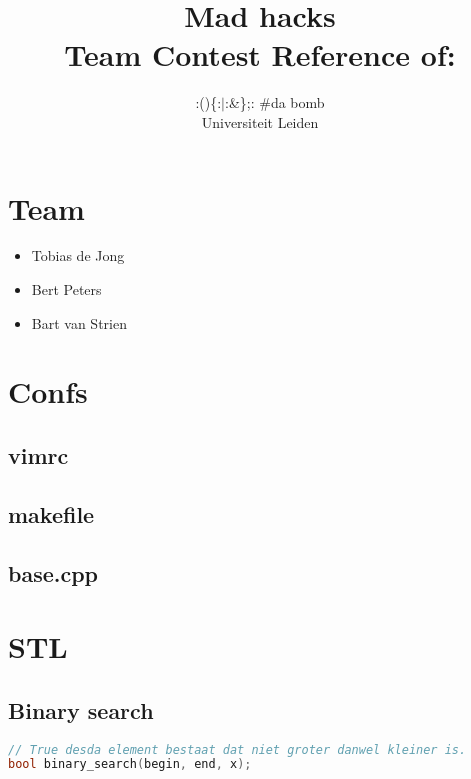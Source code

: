 \documentclass[10pt,hidelinks]{article}
\title{Mad hacks\\[1cm]
\small{Team Contest Reference of:}}
\author{:()\{:$\vert$:\&\};: \#da bomb\\[1cm]
	\small{Universiteit Leiden}}
\begin{document}
\fontsize{10}{12}


\maketitle

\newpage

\tableofcontents

\section{Team}
\begin{itemize}
\item Tobias de Jong
\item Bert Peters
\item Bart van Strien
\end{itemize}

\pagebreak

\section{Confs}

\subsection{vimrc}


\subsection{makefile}


\lstset{language=c++}

\subsection{base.cpp}


\pagebreak

\section{STL}

\subsection{Binary search}

\begin{lstlisting}[language=c++]
// True desda element bestaat dat niet groter danwel kleiner is.
bool binary_search(begin, end, x);
\end{lstlisting}
\end{document}
